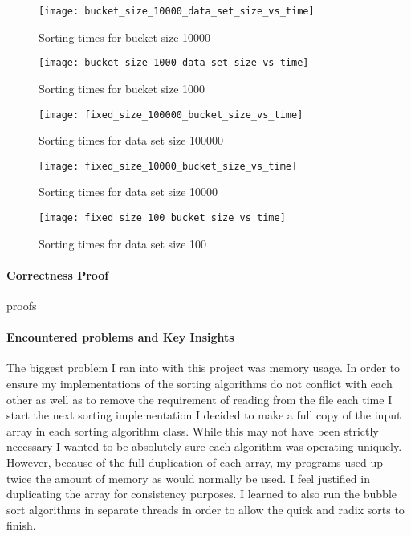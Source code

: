 \documentclass[10pt,letterpaper]{report}
\begin{document}
\begin{figure}[h]
	\centering
	\texttt{[image: bucket\_size\_10000\_data\_set\_size\_vs\_time]}
	\caption[Sorting times for bucket size 10000]{Sorting times for bucket size 10000}
	\label{fig:Sorting times with bucket size 10000}
\end{figure}

\begin{figure}[h]
	\centering
	\texttt{[image: bucket\_size\_1000\_data\_set\_size\_vs\_time]}
	\caption[Sorting times for bucket size 1000]{Sorting times for bucket size 1000}
	\label{fig: Sorting times for bucket size 1000}
\end{figure}

\pagebreak

\begin{figure}[h]
	\centering
	\texttt{[image: fixed\_size\_100000\_bucket\_size\_vs\_time]}
	\caption[Sorting times for data set size 100000]{Sorting times for data set size 100000}
	\label{fig:Sorting times for data set size 100000}
\end{figure}

\begin{figure}[h]
	\centering
	\texttt{[image: fixed\_size\_10000\_bucket\_size\_vs\_time]}
	\caption[Sorting times for data set size 10000]{Sorting times for data set size 10000}
	\label{fig:fixedsize10000bucketsizevstime}
\end{figure}


\begin{figure}[h]
	\centering
	\texttt{[image: fixed\_size\_100\_bucket\_size\_vs\_time]}
	\caption[Sorting times for data set size 100]{Sorting times for data set size 100}
	\label{fig:fixedsize100bucketsizevstime}
\end{figure}

\pagebreak
\paragraph{Correctness Proof}
	proofs
	
\paragraph{Encountered problems and Key Insights}
The biggest problem I ran into with this project was memory usage. In order to ensure my implementations of the sorting algorithms do not conflict with each other as well as to remove the requirement
of reading from the file each time I start the next sorting implementation I decided to make a full copy of the input array in each sorting algorithm class. While this may not have been strictly necessary I wanted to be absolutely sure each algorithm was operating uniquely. However, because of the full duplication of each array, my programs used up twice the amount of memory as would normally be used.  I feel justified in duplicating the array for consistency purposes. I learned to also run the bubble sort algorithms in separate threads in order to allow the quick and radix sorts to finish. 
\end{document}
